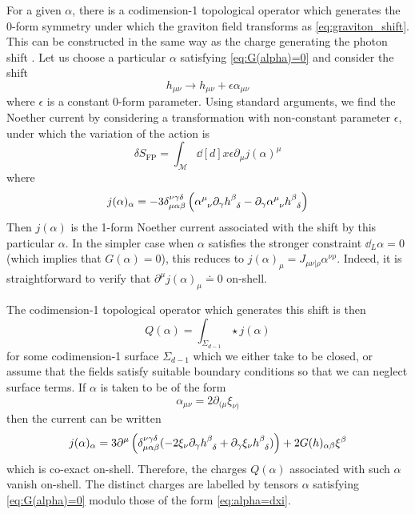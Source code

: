 For a given $\alpha$, there is a codimension-1 topological operator which generates the 0-form symmetry under which the graviton field transforms as \eqref{eq:graviton_shift}.
This can be constructed in the same way as the charge generating the photon shift \cite{Hullprep}.
Let us choose a particular $\alpha$ satisfying \eqref{eq:G(alpha)=0} and consider the shift
\begin{equation}\label{eq:0-form-shift}
    h_{\mu\nu} \to h_{\mu\nu} + \epsilon \alpha_{\mu\nu}
\end{equation}
where $\epsilon$ is a constant 0-form parameter. 
Using standard arguments, we find the Noether current by considering a transformation with non-constant parameter $\epsilon$, under which the variation of the action is
\begin{equation}
    \delta S_{\text{FP}} = \int_{\mathcal{M}} \dd[d]{x} \epsilon \partial_\mu j(\alpha)^\mu
\end{equation}
where
\begin{equation}\label{eq:j(alpha)}
    j(\alpha)_\alpha = -3 \delta^{\nu\gamma\delta}_{\mu\alpha\beta} \left( \alpha\indices{^\mu_\nu} \partial_\gamma h\indices{^\beta_\delta} - \partial_\gamma \alpha\indices{^\mu_\nu} h\indices{^\beta_\delta} \right)
\end{equation}
Then $j(\alpha)$ is the 1-form Noether current associated with the shift by this particular $\alpha$. In the simpler case when $\alpha$ satisfies the stronger constraint $\dd_L\alpha=0$ (which implies that $G(\alpha)=0$), this reduces to $j(\alpha)_\mu = J_{\mu\nu|\rho} \alpha^{\nu\rho}$. Indeed, it is straightforward to verify that $\partial^\mu j(\alpha)_\mu \doteq 0$ on-shell.

The codimension-1 topological operator which generates this shift is then
\begin{equation}\label{eq:Q(alpha)}
    Q(\alpha) = \int_{\Sigma_{d-1}} \star j(\alpha)
\end{equation}
for some codimension-1 surface $\Sigma_{d-1}$ which we either take to be closed, or assume that the fields satisfy suitable boundary conditions so that we can neglect surface terms.
If $\alpha$ is taken to be of the form 
\begin{equation}\label{eq:alpha=dxi}
    \alpha_{\mu\nu} = 2\partial_{(\mu} \xi_{\nu)}
\end{equation}
then the current can be written
\begin{equation}
    j(\alpha)_\alpha = 3\partial^\mu \left( \delta_{\mu\alpha\beta}^{\nu\gamma\delta} (-2 \xi_\nu \partial_\gamma h\indices{^\beta_\delta} + \partial_\gamma \xi_\nu h\indices{^\beta_\delta}) \right) + 2 G(h)_{\alpha\beta} \xi^\beta
\end{equation}
which is co-exact on-shell. Therefore, the charges $Q(\alpha)$ associated with such $\alpha$ vanish on-shell. The distinct charges are labelled by tensors $\alpha$ satisfying \eqref{eq:G(alpha)=0} modulo those of the form \eqref{eq:alpha=dxi}.

